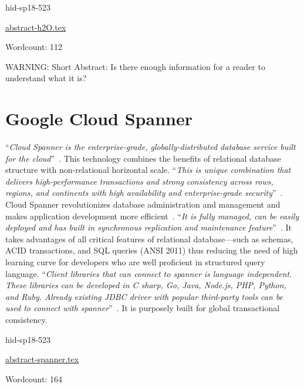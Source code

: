 \begin{IU}

hid-sp18-523

\href{https://github.com/cloudmesh-community/hid-sp18-523/blob/master//technology/abstract-h2O.tex}{abstract-h2O.tex}

 

Wordcount: 112

WARNING: Short Abstract: Is there enough information for a reader to understand what it is?

\end{IU}

\section{Google Cloud Spanner}

\color{blue}``\emph{Cloud Spanner is the enterprise-grade, globally-distributed database 
service built for the cloud}''\color{black}~\cite{hid-sp18-523-www-google-spanner}. 
This technology combines the benefits of relational database structure 
with non-relational horizontal scale. \color{blue}``\emph{This is unique combination that 
delivers high-performance transactions and strong consistency across rows, 
regions, and continents with high availability and enterprise-grade 
security}''\color{black}~\cite{hid-sp18-523-www-google-spanner}. Cloud Spanner 
revolutionizes database administration and management and makes 
application development more efficient~\cite{hid-sp18-523-www-google-spanner}.
\color{blue}``\emph{It is fully managed, can be easily deployed and has built in synchronous 
replication and maintenance feature}''\color{black}~\cite{hid-sp18-523-www-google-spanner}. 
It takes advantages of all critical features of relational database—such 
as schemas, ACID transactions, and SQL queries (ANSI 2011) thus reducing 
the need of high learning curve for developers who are well proficient in 
structured query language. 
\color{blue}``\emph{Client libraries that can connect to spanner is language independent. 
These libraries can be developed in C sharp, Go, Java, Node.js, PHP, Python, 
and Ruby. Already existing JDBC driver with popular third-party tools can be 
used to connect with spanner}''\color{black}~\cite{hid-sp18-523-www-google-spanner}. It is 
purposely built for global transactional consistency.


\begin{IU}

hid-sp18-523

\href{https://github.com/cloudmesh-community/hid-sp18-523/blob/master//technology/abstract-spanner.tex}{abstract-spanner.tex}

 

Wordcount: 164

\end{IU}

